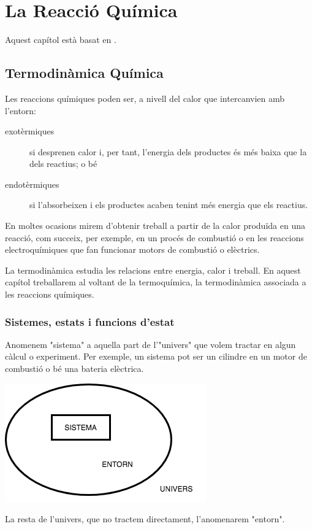 \chapter{La Reacció Química}

Aquest capítol està basat en \cite{Caamano1984,Yen2008,Dickerson1993}.

\section{Termodinàmica Química}

Les reaccions químiques poden ser, a nivell del calor que intercanvien amb l'entorn:
\begin{description}
\item[exotèrmiques] si desprenen calor i, per tant, l'energia dels productes és més baixa que la dels reactius; o bé
\item[endotèrmiques] si l'absorbeixen i els productes acaben tenint més energia que els reactius.
\end{description}

En moltes ocasions mirem d'obtenir treball a partir de la calor produïda en una reacció, com succeix, per exemple, en un procés de combustió o en les reaccions electroquímiques que fan funcionar motors de combustió o elèctrics.

La termodinàmica estudia les relacions entre energia, calor i treball.
En aquest capítol treballarem al voltant de la termoquímica, la termodinàmica associada a les reaccions químiques. 


\subsection{Sistemes, estats i funcions d'estat}

Anomenem "sistema" a aquella part de l'"univers" que volem tractar en algun càlcul o experiment. 
Per exemple, un sistema pot ser un cilindre en un motor de combustió o bé una bateria elèctrica.
\begin{center}
\includegraphics[scale=1.0]{figures/SistEntornUnivers.png}
\end{center}
La resta de l'univers, que no tractem directament, l'anomenarem "entorn".

